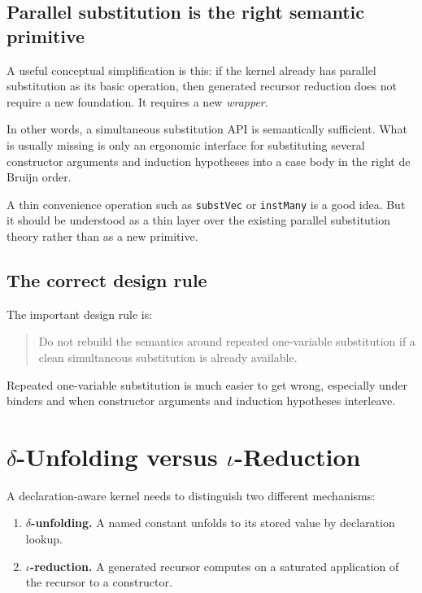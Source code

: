 \documentclass[11pt]{article}
\newcommand{\code}[1]{\texttt{#1}}
\newcommand{\deltared}{\ensuremath{\delta}}
\newcommand{\iotared}{\ensuremath{\iota}}
\begin{document}
\subsection{Parallel substitution is the right semantic primitive}

A useful conceptual simplification is this: if the kernel already has parallel
substitution as its basic operation, then generated recursor reduction does not
require a new foundation. It requires a new \emph{wrapper}.

In other words, a simultaneous substitution API is semantically sufficient.
What is usually missing is only an ergonomic interface for substituting several
constructor arguments and induction hypotheses into a case body in the right
de Bruijn order.

A thin convenience operation such as \code{substVec} or \code{instMany} is a
good idea. But it should be understood as a thin layer over the existing
parallel substitution theory rather than as a new primitive.

\subsection{The correct design rule}

The important design rule is:
\begin{quote}
Do not rebuild the semantics around repeated one-variable substitution if a
clean simultaneous substitution is already available.
\end{quote}

Repeated one-variable substitution is much easier to get wrong, especially under
binders and when constructor arguments and induction hypotheses interleave.

\section{$\delta$-Unfolding versus $\iota$-Reduction}

A declaration-aware kernel needs to distinguish two different mechanisms:
\begin{enumerate}[leftmargin=2em]
  \item \textbf{$\deltared$-unfolding.} A named constant unfolds to its stored
  value by declaration lookup.
  \item \textbf{$\iotared$-reduction.} A generated recursor computes on a
  saturated application of the recursor to a constructor.
\end{enumerate}
\end{document}
